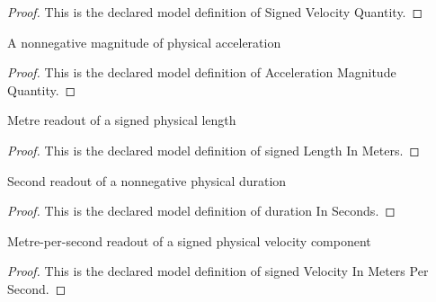 \begin{proof}
  This is the declared model definition of Signed Velocity Quantity.
\end{proof}
\begin{definition}
  \label{def:physics:phyx-mini-0749:phyxminiproblems-problemphyxmini0749-accelerationmagnitudequantity}
  A nonnegative magnitude of physical acceleration
\end{definition}
\begin{proof}
  This is the declared model definition of Acceleration Magnitude Quantity.
\end{proof}
\begin{definition}
  \label{def:physics:phyx-mini-0749:phyxminiproblems-problemphyxmini0749-signedlengthinmeters}
  Metre readout of a signed physical length
\end{definition}
\begin{proof}
  This is the declared model definition of signed Length In Meters.
\end{proof}
\begin{definition}
  \label{def:physics:phyx-mini-0749:phyxminiproblems-problemphyxmini0749-durationinseconds}
  Second readout of a nonnegative physical duration
\end{definition}
\begin{proof}
  This is the declared model definition of duration In Seconds.
\end{proof}
\begin{definition}
  \label{def:physics:phyx-mini-0749:phyxminiproblems-problemphyxmini0749-signedvelocityinmeterspersecond}
  Metre-per-second readout of a signed physical velocity component
\end{definition}
\begin{proof}
  This is the declared model definition of signed Velocity In Meters Per Second.
\end{proof}
